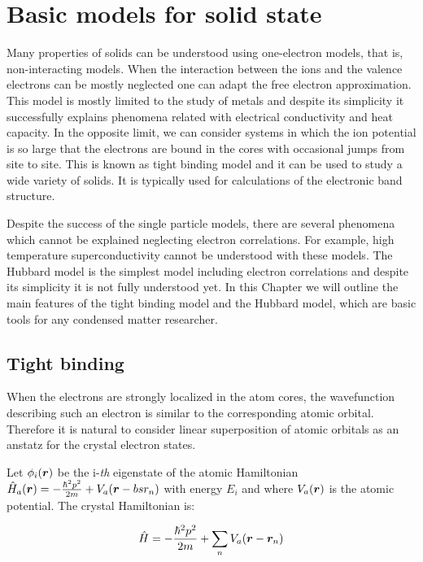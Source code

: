 \chapter{Basic models for solid state}

Many properties of solids can be understood using one-electron models, that is, non-interacting models. When the interaction between the ions and the valence electrons can be mostly neglected one can adapt the free electron approximation. This model is mostly limited to the study of metals and despite its simplicity it successfully explains phenomena related with electrical conductivity and heat capacity. In the opposite limit, we can consider systems in which the ion potential is so large that the electrons are bound in the cores with occasional jumps from site to site. This is known as tight binding model and it can be used to study a wide variety of solids. It is typically used for calculations of the electronic band structure.

Despite the success of the single particle models, there are several phenomena which cannot be explained neglecting electron correlations. For example, high temperature superconductivity cannot be understood with these models. The Hubbard model is the simplest model including electron correlations and despite its simplicity it is not fully understood yet. In this Chapter we will outline the main features of the tight binding model and the Hubbard model, which are basic tools for any condensed matter researcher.

\section{Tight binding}

When the electrons are strongly localized in the atom cores, the wavefunction describing such an electron is similar to the corresponding atomic orbital. Therefore it is natural to consider linear superposition of atomic orbitals as an anstatz for the crystal electron states.

Let $\phi_i(\boldsymbol{r})$ be the i-\textit{th} eigenstate of the atomic Hamiltonian $\hat{H}_a(\boldsymbol{r}) = -\frac{\hbar^2p^2}{2m} + V_a(\boldsymbol{r}-bs{r}_n)$ with energy $E_i$ and where $V_a(\boldsymbol{r})$ is the atomic potential. The crystal Hamiltonian is:

\begin{equation}
\label{CrystalHam}
\hat{H} = -\frac{\hbar^2p^2}{2m} + \sum_n V_a(\boldsymbol{r}-\boldsymbol{r}_n)
\end{equation}

